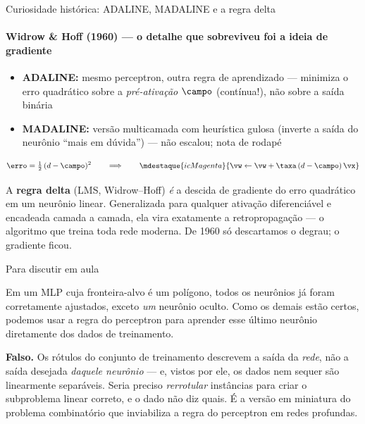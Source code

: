 \documentclass[aspectratio=169, 11pt]{beamer}
\begin{document}
\begin{frame}{Curiosidade histórica: ADALINE, MADALINE e a regra delta}
  \framesubtitle{Widrow \& Hoff (1960) — o detalhe que sobreviveu foi a ideia de gradiente}

  \begin{itemize}\setlength{\itemsep}{0.3ex}
    \item \textbf{ADALINE:} mesmo perceptron, outra regra de aprendizado —
          minimiza o erro quadrático sobre a \emph{pré-ativação} $\campo$
          (contínua!), não sobre a saída binária
    \item \textbf{MADALINE:} versão multicamada com heurística gulosa (inverte
          a saída do neurônio ``mais em dúvida'') — não escalou; nota de rodapé
  \end{itemize}

  \[
    \erro = \tfrac{1}{2}\,(d - \campo)^2
    \qquad\Longrightarrow\qquad
    \mdestaque{icMagenta}{\vw \leftarrow \vw + \taxa\,(d - \campo)\,\vx}
  \]

  \begin{ideiabox}
    A \textbf{regra delta} (LMS, Widrow--Hoff) \emph{é} a descida de gradiente
    do erro quadrático em um neurônio linear. Generalizada para qualquer
    ativação diferenciável e encadeada camada a camada, ela vira exatamente a
    \alert{retropropagação} — o algoritmo que treina toda rede moderna. De
    1960 só descartamos o degrau; o gradiente ficou.
  \end{ideiabox}
\end{frame}

\begin{frame}{Para discutir em aula}
  \begin{quizbox}
    Em um MLP cuja fronteira-alvo é um polígono, todos os neurônios já foram
    corretamente ajustados, exceto \emph{um} neurônio oculto. Como os demais
    estão certos, podemos usar a regra do perceptron para aprender esse último
    neurônio diretamente dos dados de treinamento.

    \smallskip
  \end{quizbox}

  \pause

  \begin{respbox}
    \textbf{Falso.} Os rótulos do conjunto de treinamento descrevem a saída da
    \emph{rede}, não a saída desejada \emph{daquele neurônio} — e, vistos por
    ele, os dados nem sequer são linearmente separáveis. Seria preciso
    \emph{rerrotular} instâncias para criar o subproblema linear correto, e o
    dado não diz quais. É a versão em miniatura do problema combinatório que
    inviabiliza a regra do perceptron em redes profundas.
  \end{respbox}
\end{frame}
\end{document}
